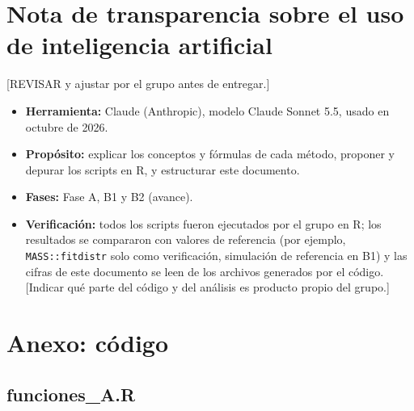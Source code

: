 \documentclass[
  spanish,
]{article}
\providecommand{\tightlist}{%
  \setlength{\itemsep}{0pt}\setlength{\parskip}{0pt}}
\begin{document}
\section{Nota de transparencia sobre el uso de inteligencia
artificial}\label{nota-de-transparencia-sobre-el-uso-de-inteligencia-artificial}

{[}REVISAR y ajustar por el grupo antes de entregar.{]}

\begin{itemize}
\tightlist
\item
  \textbf{Herramienta:} Claude (Anthropic), modelo Claude Sonnet 5.5,
  usado en octubre de 2026.
\item
  \textbf{Propósito:} explicar los conceptos y fórmulas de cada método,
  proponer y depurar los scripts en R, y estructurar este documento.
\item
  \textbf{Fases:} Fase A, B1 y B2 (avance).
\item
  \textbf{Verificación:} todos los scripts fueron ejecutados por el
  grupo en R; los resultados se compararon con valores de referencia
  (por ejemplo, \texttt{MASS::fitdistr} solo como verificación,
  simulación de referencia en B1) y las cifras de este documento se leen
  de los archivos generados por el código. {[}Indicar qué parte del
  código y del análisis es producto propio del grupo.{]}
\end{itemize}

\newpage

\section{Anexo: código}\label{anexo-cuxf3digo}

\subsection{funciones\_A.R}\label{funciones_a.r}
\end{document}
